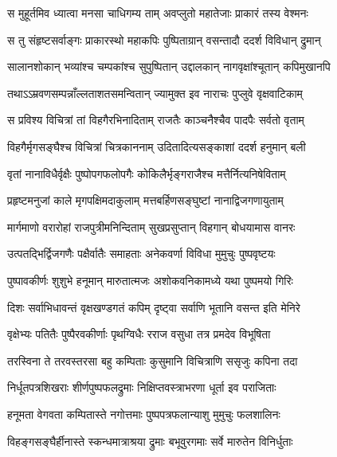 
\twolineshloka
{स मुहूर्तमिव ध्यात्वा मनसा चाधिगम्य ताम्}
{अवप्लुतो महातेजाः प्राकारं तस्य वेश्मनः} %

\twolineshloka
{स तु संहृष्टसर्वाङ्गः प्राकारस्थो महाकपिः}
{पुष्पिताग्रान् वसन्तादौ ददर्श विविधान् द्रुमान्} %

\twolineshloka
{सालानशोकान् भव्यांश्च चम्पकांश्च सुपुष्पितान्}
{उद्दालकान् नागवृक्षांश्चूतान् कपिमुखानपि} %

\twolineshloka
{तथाऽऽम्रवणसम्पन्नाँल्लताशतसमन्वितान्}
{ज्यामुक्त इव नाराचः पुप्लुवे वृक्षवाटिकाम्} %

\twolineshloka
{स प्रविश्य विचित्रां तां विहगैरभिनादिताम्}
{राजतैः काञ्चनैश्चैव पादपैः सर्वतो वृताम्} %

\twolineshloka
{विहगैर्मृगसङ्घैश्च विचित्रां चित्रकाननाम्}
{उदितादित्यसङ्काशां ददर्श हनुमान् बली} %

\twolineshloka
{वृतां नानाविधैर्वृक्षैः पुष्पोपगफलोपगैः}
{कोकिलैर्भृङ्गराजैश्च मत्तैर्नित्यनिषेविताम्} %

\twolineshloka
{प्रहृष्टमनुजां काले मृगपक्षिमदाकुलाम्}
{मत्तबर्हिणसङ्घुष्टां नानाद्विजगणायुताम्} %

\twolineshloka
{मार्गमाणो वरारोहां राजपुत्रीमनिन्दिताम्}
{सुखप्रसुप्तान् विहगान् बोधयामास वानरः} %

\twolineshloka
{उत्पतद्भिर्द्विजगणैः पक्षैर्वातैः समाहताः}
{अनेकवर्णा विविधा मुमुचुः पुष्पवृष्टयः} %

\twolineshloka
{पुष्पावकीर्णः शुशुभे हनूमान् मारुतात्मजः}
{अशोकवनिकामध्ये यथा पुष्पमयो गिरिः} %

\twolineshloka
{दिशः सर्वाभिधावन्तं वृक्षखण्डगतं कपिम्}
{दृष्ट्वा सर्वाणि भूतानि वसन्त इति मेनिरे} %

\twolineshloka
{वृक्षेभ्यः पतितैः पुष्पैरवकीर्णाः पृथग्विधैः}
{रराज वसुधा तत्र प्रमदेव विभूषिता} %

\twolineshloka
{तरस्विना ते तरवस्तरसा बहु कम्पिताः}
{कुसुमानि विचित्राणि ससृजुः कपिना तदा} %

\twolineshloka
{निर्धूतपत्रशिखराः शीर्णपुष्पफलद्रुमाः}
{निक्षिप्तवस्त्राभरणा धूर्ता इव पराजिताः} %

\twolineshloka
{हनूमता वेगवता कम्पितास्ते नगोत्तमाः}
{पुष्पपत्रफलान्याशु मुमुचुः फलशालिनः} %

\twolineshloka
{विहङ्गसङ्घैर्हीनास्ते स्कन्धमात्राश्रया द्रुमाः}
{बभूवुरगमाः सर्वे मारुतेन विनिर्धुताः} %

